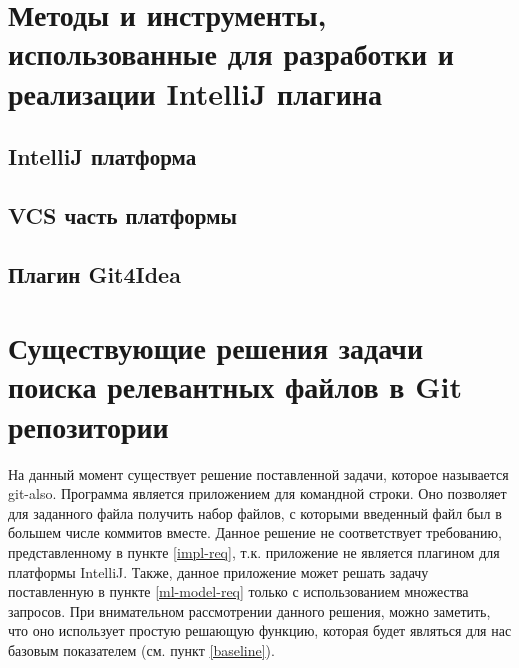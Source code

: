 \section{Методы и инструменты, использованные для разработки и реализации IntelliJ плагина}
    \subsection{IntelliJ платформа}
    \subsection{VCS часть платформы}
    \subsection{Плагин Git4Idea}
\section{Существующие решения задачи поиска релевантных файлов в Git репозитории}
На данный момент существует решение поставленной задачи, которое называется git-also. Программа является приложением для командной строки. Оно позволяет для заданного файла получить набор файлов, с которыми введенный файл был в большем числе коммитов вместе. Данное решение не соответствует требованию, представленному в пункте \ref{impl-req}, т.к. приложение не является плагином для платформы IntelliJ. Также, данное приложение может решать задачу поставленную в пункте \ref{ml-model-req} только с использованием множества запросов. При внимательном рассмотрении данного решения, можно заметить, что оно использует простую решающую функцию, которая будет являться для нас базовым показателем (см. пункт \ref{baseline}).
\chapterconclusion